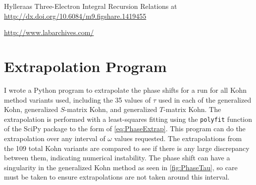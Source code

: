 \documentclass[Dissertation.tex]{subfiles}
\begin{document}

Hylleraas Three-Electron Integral Recursion Relations at \url{http://dx.doi.org/10.6084/m9.figshare.1419455}

\url{http://www.labarchives.com/}





\section{Extrapolation Program}
I wrote a Python \cite{Python} program to extrapolate the phase shifts for a 
run for all Kohn method variants used, including the 35 values of $\tau$ used 
in each of the generalized Kohn, generalized $S$-matrix Kohn, and generalized
$T$-matrix Kohn. The extrapolation is performed with a least-squares fitting 
using the \texttt{polyfit} function of the SciPy package \cite{SciPy} to the 
form of \cref{eq:PhaseExtrap}. This program can do the extrapolation over any 
interval of $\omega$ values requested. The extrapolations from the 109 total 
Kohn variants are compared to see if there is any large discrepancy between 
them, indicating numerical instability. The phase shift can have a 
singularity in the generalized Kohn method as seen in \cref{fig:PhaseTau}, so 
care must be taken to ensure extrapolations are not taken around this interval.


\biblio
\end{document}
